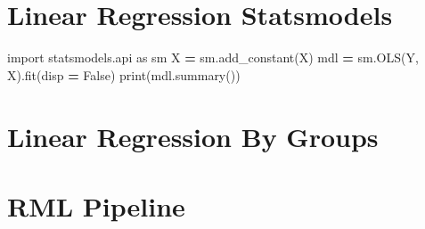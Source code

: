 \documentclass[]{book}
\newenvironment{Shaded}{\begin{snugshade}}{\end{snugshade}}
\newcommand{\BuiltInTok}[1]{#1}
\newcommand{\ControlFlowTok}[1]{\textcolor[rgb]{0.13,0.29,0.53}{\textbf{#1}}}
\newcommand{\DataTypeTok}[1]{\textcolor[rgb]{0.13,0.29,0.53}{#1}}
\newcommand{\ErrorTok}[1]{\textcolor[rgb]{0.64,0.00,0.00}{\textbf{#1}}}
\newcommand{\ImportTok}[1]{#1}
\newcommand{\KeywordTok}[1]{\textcolor[rgb]{0.13,0.29,0.53}{\textbf{#1}}}
\newcommand{\NormalTok}[1]{#1}
\newcommand{\OperatorTok}[1]{\textcolor[rgb]{0.81,0.36,0.00}{\textbf{#1}}}
\newcommand{\StringTok}[1]{\textcolor[rgb]{0.31,0.60,0.02}{#1}}
\newcommand{\VariableTok}[1]{\textcolor[rgb]{0.00,0.00,0.00}{#1}}
\begin{document}
\hypertarget{linear-regression-statsmodels}{%
\section{Linear Regression Statsmodels}\label{linear-regression-statsmodels}}

\begin{Shaded}
\begin{Highlighting}[]
\ImportTok{import}\NormalTok{ statsmodels.api }\ImportTok{as}\NormalTok{ sm}
\NormalTok{X }\OperatorTok{=}\NormalTok{ sm.add_constant(X)}
\NormalTok{mdl }\OperatorTok{=}\NormalTok{ sm.OLS(Y, X).fit(disp }\OperatorTok{=} \VariableTok{False}\NormalTok{)}
\BuiltInTok{print}\NormalTok{(mdl.summary())}
\end{Highlighting}
\end{Shaded}

\hypertarget{linear-regression-by-groups}{%
\section{Linear Regression By Groups}\label{linear-regression-by-groups}}

\begin{Shaded}
\end{Shaded}

\hypertarget{rml-pipeline}{%
\section{RML Pipeline}\label{rml-pipeline}}
\end{document}
